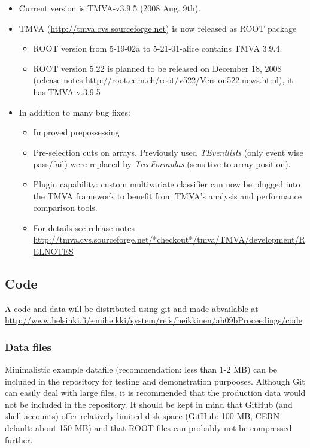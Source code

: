\begin{appendix}
\begin{itemize}
\item Current version is TMVA-v3.9.5 (2008 Aug. 9th).
\item TMVA (\url{http://tmva.cvs.sourceforge.net}) is now released as ROOT package

\begin{itemize}
\item ROOT version from 5-19-02a to 5-21-01-alice contains TMVA 3.9.4.
\item ROOT version 5.22 is planned to be released on December 18, 2008
  (release notes \url{http://root.cern.ch/root/v522/Version522.news.html}),
  it has TMVA-v.3.9.5
\end{itemize}

\item In addition to many bug fixes:
\begin{itemize}
\item Improved prepossessing
\item Pre-selection cuts on arrays. Previously used {\em TEventlists} 
(only event  wise pass/fail) were replaced by {\em TreeFormulas} (sensitive to array position).
\item Plugin capability: custom multivariate classifier can now be plugged into
    the TMVA framework to benefit from TMVA's analysis and performance comparison
    tools. 

\item For details see release notes 
\url{http://tmva.cvs.sourceforge.net/*checkout*/tmva/TMVA/development/RELNOTES}
\end{itemize}

\end{itemize}
\subsection{Code}
A code and data will be distributed using git and made abvailable 
at \\ \url{http://www.helsinki.fi/~miheikki/system/refs/heikkinen/ah09bProceedings/code}

\subsubsection{Data files}
Minimalistic example datafile (recommendation: less than 1-2 MB) can
be included in the repository for testing and demonstration
purpooses. Although Git can easily deal with large files, it is
recommended that the production data would not be
included in the repository. It should be kept in mind that GitHub
(and shell accounts) offer relatively limited disk space (GitHub: 100
MB, CERN default: about 150 MB) and that ROOT files can probably not be
compressed further.


\end{appendix}
